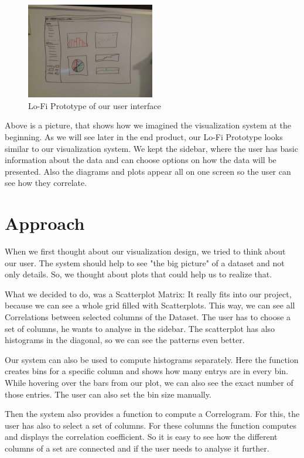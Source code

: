 \documentclass{vgtc}                          %
\begin{document}
\begin{figure}[h]
\includegraphics[width=0.5\textwidth]{Prototype1.jpg}
\centering
\caption{Lo-Fi Prototype of our user interface}
\end{figure}

Above is a picture, that shows how we imagined the visualization system at the beginning.
As we will see later in the end product, our Lo-Fi Prototype looks similar to our visualization system. We kept the sidebar, where the user has basic information about the data and can choose options on how the data will be presented. Also the diagrams and plots appear all on one screen so the user can see how they correlate.

\section{Approach}
When we first thought about our visualization design, we tried to think about our user. The system should help to see "the big picture" of a dataset and not only details. So, we thought about plots that could help us to realize that.

What we decided to do, was a Scatterplot Matrix: It really fits into our project, because we can see a whole grid filled with Scatterplots. This way, we can see all Correlations between selected columns of the Dataset.
The user has to choose a set of columns, he wants to analyse in the sidebar. The scatterplot has also histograms in the diagonal, so we can see the patterns even better.

Our system can also be used to compute histograms separately. Here the function creates bins for a specific column and shows how many entrys are in every bin. While hovering over the bars from our plot, we can also see the exact number of those entries.
The user can also set the bin size manually.

Then the system also provides a function to compute a Correlogram. For this, the user has also to select a set of columns. For these columns the function computes and displays the correlation coefficient. So it is easy to see how the different columns of a set are connected and if the user needs to analyse it further.
\end{document}
